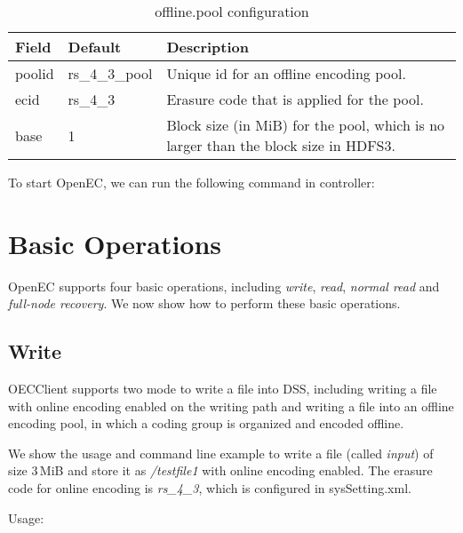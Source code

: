\documentclass[letterpaper,12pt]{article}
\newcommand{\openec}{{\sf\small OpenEC}\xspace}
\begin{document}
\begin{table}[!t]
\centering
\footnotesize
\renewcommand{\arraystretch}{1.1}
\begin{tabular}{|l|l|l|}
\hline
Field & Default & Description \\
\hline
\hline
poolid & rs\_4\_3\_pool & Unique id for an offline encoding pool. \\
\hline
ecid & rs\_4\_3 & Erasure code that is applied for the pool. \\
\hline
base & 1 & Block size (in MiB) for the pool, which is no larger than the block size in HDFS3. \\ 
\hline
\end{tabular}
\vspace{-3pt}
\caption{offline.pool configuration}
\label{tab:offlinepool}
\end{table}

To start \openec, we can run the following command in controller:

\begin{center}
\noindent{}
\end{center}

\section{Basic Operations}

\openec supports four basic operations, including {\sl write}, {\sl read}, {\sl normal read} and
{\sl full-node recovery}. We now show how to perform these basic operations. 

\subsection{Write}

OECClient supports two mode to write a file into DSS, including writing a file with online encoding
enabled on the writing path and writing a file into an offline encoding pool, in which a coding group
is organized and encoded offline.

We show the usage and command line example to write a file (called {\sl input}) of 
size 3\,MiB and store it as {\sl /testfile1} with online encoding enabled. The erasure code 
for online encoding is {\sl rs\_4\_3}, which is configured in sysSetting.xml.

Usage:
\begin{center}
\noindent{}
\end{center}
\end{document}
